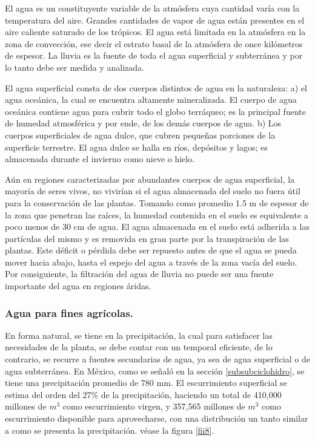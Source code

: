 El agua es un constituyente variable de la atmósfera cuya cantidad varía con la
temperatura del aire. Grandes cantidades de vapor de agua están presentes en el aire
caliente saturado de los trópicos. El agua está limitada en la atmósfera en la zona de
convección, ese decir el estrato basal de la atmósfera de once kilómetros de espesor.
La lluvia es la fuente de toda el agua superficial y subterránea y por lo tanto debe ser
medida y analizada.

El agua superficial consta de dos cuerpos distintos de agua en la naturaleza: a)
el agua oceánica, la cual se encuentra altamente mineralizada. El cuerpo de
agua oceánica contiene agua para cubrir todo el globo terráqueo; es la principal fuente
de humedad atmosférica y por ende, de los demás cuerpos de agua. b) Los cuerpos
superficiales de agua dulce, que cubren pequeñas porciones de la superficie terrestre.
El agua dulce se halla en ríos, depósitos y lagos; es almacenada durante el invierno
como nieve o hielo.

Aún en regiones caracterizadas por abundantes cuerpos de agua superficial, la
mayoría de seres vivos, no vivirían si el agua almacenada del
suelo no fuera útil para la conservación de las plantas. Tomando como promedio 1.5 m
de espesor de la zona que penetran las raíces, la humedad contenida en el suelo es
equivalente a poco menos de 30 cm de agua. El agua almacenada en el suelo está
adherida a las partículas del mismo y es removida en gran parte por la transpiración de
las plantas. Este déficit o pérdida debe ser repuesto antes de que el agua se pueda
mover hacia abajo, hasta el espejo del agua a través de la zona vacía del suelo. Por
consiguiente, la filtración del agua de lluvia no puede ser una fuente importante del
agua en regiones áridas.

\subsubsection*{Agua para fines agrícolas.}
En forma natural, se tiene en la precipitación, la cual
para satisfacer las necesidades de la planta, se debe contar con un
temporal eficiente, de lo contrario, se recurre a
fuentes secundarias de agua, ya sea de agua superficial o de agua subterránea.
En México, como se señaló en la sección \ref{subsubciclohidro}, se tiene una precipitación promedio
de 780 mm. El escurrimiento superficial se estima del orden del 27\% de la
precipitación, haciendo un total de 410,000 millones de $ m^3$ como escurrimiento virgen, y
357,565 millones de $ m^3$ como escurrimiento disponible para aprovecharse, con una
distribución un tanto similar a como se presenta la precipitación. véase la figura \ref{fii8}.

